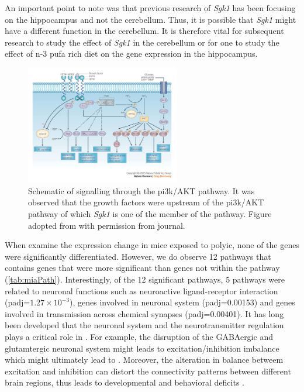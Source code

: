 \documentclass[12pt]{scrbook}
\newcommand*{\glng}{\glsentrylong}
\begin{document}
An important point to note was that previous research of \textit{Sgk1} has been focusing on the hippocampus and not the cerebellum. 
Thus, it is possible that \textit{Sgk1} might have a different function in the cerebellum. 
It is therefore vital for subsequent research to study the effect of \textit{Sgk1} in the cerebellum or for one to study the effect of n-3 \gls{pufa} rich diet on the gene expression in the hippocampus. 

\begin{figure}
	\centering
	\includegraphics[width=0.6\textwidth]{figure/omega/pi3ksignaling.jpg}
	\caption[Schematic of signalling through the PI3K/AKT pathway]{
		Schematic of signalling through the \gls{pi3k}/AKT pathway.
		It was observed that the growth factors were upstream of the \gls{pi3k}/AKT pathway of which \textit{Sgk1} is one of the member of the pathway.
		Figure adopted from \citet{Hennessy2005} with permission from journal.
	}\label{fig:pi3kPathway}
\end{figure}
When examine the expression change in mice exposed to \gls{polyic}, none of the genes were significantly differentiated. 
However, we do observe 12 pathways that contains genes that were more significant than genes not within the pathway (\cref{tab:miaPath}).
Interestingly, of the 12 significant pathways, 5 pathways were related to neuronal functions such as neuroactive ligand-receptor interaction (padj=$1.27\times 10^{-3}$), genes involved in neuronal system (padj=0.00153) and genes involved in transmission across chemical synapses (padj=0.00401).
It has long been developed that the neuronal system and the neurotransmitter regulation plays a critical role in \glng{scz}.
For example, the disruption of the GABAergic and glutamtergic neuronal system might leads to excitation/inhibition imbalance which might ultimately lead to \glng{scz} \citep{Wassef2003}.
Moreover, the alteration in balance betweem excitation and inhibition can distort the connectivity patterns between different brain regions, thus leads to developmental and behavioral deficits \citep{Cline2005}.
\end{document}
